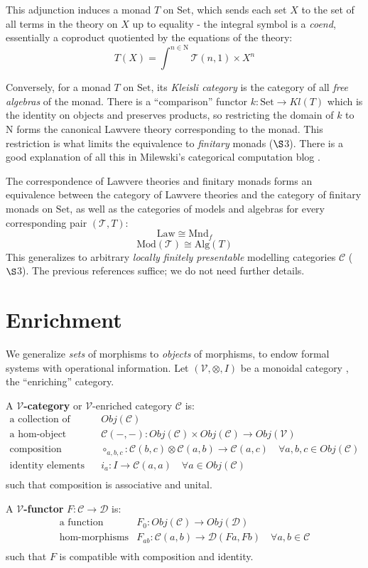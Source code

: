 \documentclass[a4paper,UKenglish]{article}
\theoremstyle{definition}
\newcommand{\Set}{\mathrm{Set}}
\newcommand{\Alg}{\mathrm{Alg}}
\newcommand{\Mod}{\mathrm{Mod}}
\newcommand{\NN}{\mathrm{N}}
\newcommand{\V}{\mathscr{V}}
\newcommand{\D}{\mathscr{D}}
\newcommand{\C}{\mathscr{C}}
\newcommand{\T}{\mathscr{T}}
\begin{document}
This adjunction induces a monad $T$ on $\Set$, which sends each set $X$ to the set of all terms in the theory on $X$ up to equality - the integral symbol is a \textit{coend}, essentially a coproduct quotiented by the equations of the theory: $$T(X) = \int^{n\in \NN} \T(n,1) \times X^n$$

Conversely, for a monad $T$ on $\Set$, its \textit{Kleisli category} is the category of all \textit{free algebras} of the monad. There is a ``comparison'' functor $k: \Set \to Kl(T)$ which is the identity on objects and preserves products, so restricting the domain of $k$ to $\NN$ forms the canonical Lawvere theory corresponding to the monad. This restriction is what limits the equivalence to \textit{finitary} monads ($\S$3). There is a good explanation of all this in Milewski's categorical computation blog \cite{milew}.

The correspondence of Lawvere theories and finitary monads forms an equivalence between the category of Lawvere theories and the category of finitary monads on $\Set$, as well as the categories of models and algebras for every corresponding pair $(\T, T)$: $$\mathrm{Law} \cong \mathrm{Mnd}_f$$ $$\Mod(\T) \cong \Alg(T)$$ This generalizes to arbitrary \textit{locally finitely presentable} modelling categories $\C$ ($\S$3). The previous references suffice; we do not need further details. 

\section{Enrichment}
We generalize \textit{sets} of morphisms to \textit{objects} of morphisms, to endow formal systems with operational information. Let $(\V,\otimes,I)$ be a monoidal category \cite{maclane}, the ``enriching'' category.

A \textbf{$\V$-category} or $\V$-enriched category $\C$ is:
\[\begin{array}{rl}
\text{a collection of objects} & Obj(\C)\\
\text{a hom-object function} & \C(-,-):Obj(\C) \times Obj(\C) \to Obj(\V)\\
\text{composition morphisms} & \circ_{a,b,c}:\C(b,c) \otimes \C(a,b) \to \C(a,c) \quad \forall a,b,c \in Obj(\C)\\
\text{identity elements} & i_a:I\to\C(a,a) \quad \forall a \in Obj(\C)\\
\end{array}\]
such that composition is associative and unital.

A \textbf{$\V$-functor} $F:\C \to \D$ is:
\[\begin{array}{rl}
\text{a function} & F_0: Obj(\C) \to Obj(\D)\\
\text{hom-morphisms} & F_{ab}: \C(a,b) \to \D(Fa,Fb) \quad \forall a,b \in \C\\
\end{array}\]
such that $F$ is compatible with composition and identity.
\end{document}
